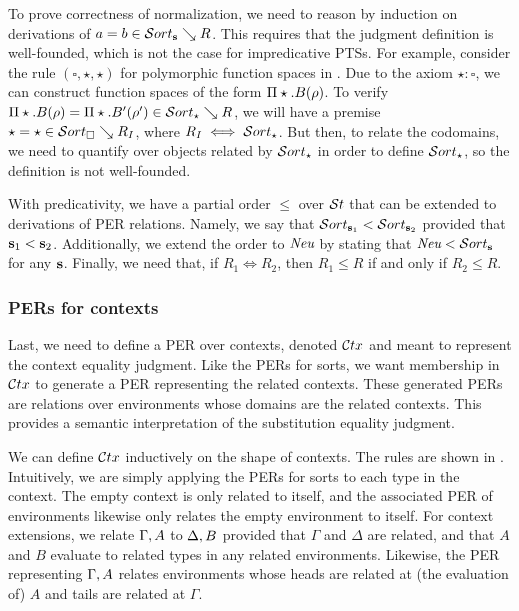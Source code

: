 To prove correctness of normalization, we need to reason by induction on derivations of $a = b \in \persort \searrow R$.
This requires that the judgment definition is well-founded, which is not the case for impredicative \acp{PTS}.
For example, consider the rule $(\square, \star, \star)$ for polymorphic function spaces in \sysf.
Due to the axiom $\star : \square$, we can construct function spaces of the form $\Pi\star.B(\rho)$.
To verify $\dpi \star B \rho = \dpi \star {B'} {\rho'} \in \persort[\star] \searrow R$, we will have a premise $\star = \star \in \persort[\square] \searrow R_I$,
  where $R_I \iff \persort[\star]$.
But then, to relate the codomains, we need to quantify over objects related by $\persort[\star]$ in order to define $\persort[\star]$, so the definition is not well-founded.

With predicativity, we have a partial order $\leq$ over $\mathcal{S}t$ that can be extended to derivations of PER relations.
Namely, we say that $\persort[\tmcst s_1] < \persort[\tmcst s_2]$ provided that $\textbf{s}_1 < \textbf{s}_2$.
Additionally, we extend the order to ${\normalfont\textit{Neu}}$ by stating that $\perneu < \persort$ for any $\textbf{s}$.
Finally, we need that, if $R_1 \iff R_2$, then $R_1 \leq R$ if and only if $R_2 \leq R$.


\subsubsection{PERs for contexts}



Last, we need to define a \ac{PER} over contexts, denoted $\mathcal{C}tx$ and meant to represent the context equality judgment.
Like the \acp{PER} for sorts, we want membership in $\mathcal{C}tx$ to generate a \ac{PER} representing the related contexts.
These generated \acp{PER} are relations over environments whose domains are the related contexts.
This provides a semantic interpretation of the substitution equality judgment.

We can define $\mathcal{C}tx$ inductively on the shape of contexts.
The rules are shown in .
Intuitively, we are simply applying the \acp{PER} for sorts to each type in the context.
The empty context is only related to itself, and the associated \ac{PER} of environments likewise only relates the empty environment to itself.
For context extensions, we relate $\Gamma, A$ to $\Delta, B$ provided that $\Gamma$ and $\Delta$ are related,
  and that $A$ and $B$ evaluate to related types in any related environments.
Likewise, the \ac{PER} representing $\Gamma, A$ relates environments whose heads are related at (the evaluation of) $A$ and tails are related at $\Gamma$.


